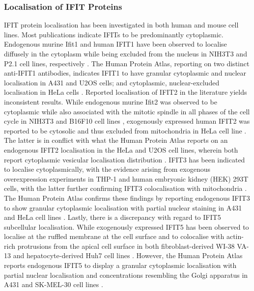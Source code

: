 \subsubsection{Localisation of IFIT Proteins} \label{Localisation of IFIT Proteins}
IFIT protein localisation has been investigated in both human and mouse cell lines. Most publications indicate IFITs to be predominantly cytoplasmic. Endogenous murine Ifit1 and human IFIT1 have been observed to localise diffusely in the cytoplasm while being excluded from the nucleus in NIH3T3 and P2.1 cell lines, respectively \cite{Pichlmair2011IFIT1RNA, Terenzi2008Interferon-inducibleE1}. The Human Protein Atlas, reporting on two distinct anti-IFIT1 antibodies, indicates IFIT1 to have granular cytoplasmic and nuclear localisation in A431 and U2OS cells; and cytoplasmic, nuclear-excluded localisation in HeLa cells \cite{Thul2017AProteome}. Reported localisation of IFIT2 in the literature yields inconsistent results. While endogenous murine Ifit2 was observed to be cytoplasmic while also associated with the mitotic spindle in all phases of the cell cycle in NIH3T3 and B16F10 cell lines \cite{Saha2006IdentificationProtein}, exogenously expressed human IFIT2 was reported to be cytosolic and thus excluded from mitochondria in HeLa cell line \cite{Stawowczyk2011TheApoptosis}. The latter is in conflict with what the Human Protein Atlas reports on an endogenous IFIT2 localisation in the HeLa and U2OS cell lines, wherein both report cytoplasmic vesicular localisation distribution \cite{Thul2017AProteome}. IFIT3 has been indicated to localise cytoplasmically, with the evidence arising from exogenous overexpression experiments in THP-1 and human embryonic kidney (HEK) 293T cells, with the latter further confirming IFIT3 colocalisation with mitochondria \cite{Huang2008Interferon-inducedCells, Liu2011IFN-InducedTBK1}. The Human Protein Atlas confirms these findings by reporting endogenous IFIT3 to show granular cytoplasmic localisation with partial nuclear staining in A431 and HeLa cell lines \cite{Thul2017AProteome}. Lastly, there is a discrepancy with regard to IFIT5 subcellular localisation. While exogenously expressed IFIT5 has been observed to localise at the ruffled membrane at the cell surface and to colocalise with actin-rich protrusions from the apical cell surface in both fibroblast-derived WI-38 VA-13 and hepatocyte-derived Huh7 cell lines \cite{Katibah2013TRNAIFIT5}. However, the Human Protein Atlas reports endogenous IFIT5 to display a granular cytoplasmic localisation with partial nuclear localisation and concentrations resembling the Golgi apparatus in A431 and SK-MEL-30 cell lines \cite{Thul2017AProteome}. 

